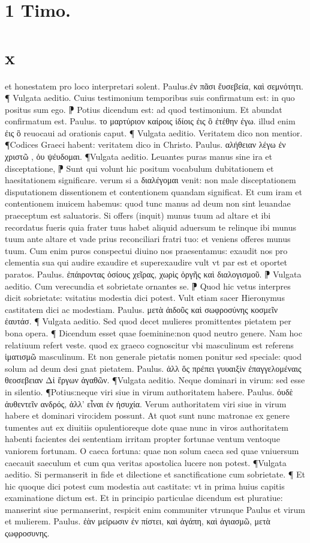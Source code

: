 \documentclass{article}
\begin{document}
\begin{pages}
\section*{1 Timo. }
\section*{x }
\marginpar{[ p.204 ]}\pstart et honestatem pro loco interpretari solent. Paulus.ἐν πᾶσι ἔυσεβεία, καὶ σεμνότητι. ¶ Vulgata aeditio. Cuius testimonium temporibus suis confirmatum est: in quo  positus sum ego. ⁋ Potius dicendum est: ad quod testimonium. Et abundat confirmatum est. Paulus. το μαρτύριον καίροις ἰδίοις ἐις ὃ ἐτέθην ἐγω. illud enim ἐις ὃ  reuocaui ad orationis caput. ¶ Vulgata aeditio. Veritatem dico non mentior. ¶Codices Graeci habent: veritatem dico in Christo. Paulus. αλήθειαν λέγω ἐν χριστῶ , ὀυ ψέυδομαι. ¶Vulgata aeditio. Leuantes puras manus sine ira et disceptatione, ⁋ Sunt qui volunt hic positum vocabulum dubitationem et haesitationem significare. verum si a διαλέγομαι venit: non male disceptationem disputationem dissentionem et contentionem quandam significat. Et cum iram et contentionem inuicem habemus: quod tunc manus ad deum non sint leuandae praeceptum est saluatoris. Si offers (inquit) munus tuum ad altare et ibi recordatus fueris quia frater tuus habet aliquid aduersum te relinque ibi munus tuum ante altare et vade prius reconciliari fratri tuo: et veniens offeres munus tuum. Cum enim puros conspectui diuino nos praesentamus: exaudit nos pro clementia sua qui audire exaudire et superexaudire vult vt par est et oportet paratos. Paulus. ἐπάιροντας ὁσίους χεῖρας, χωρὶς ὀργῆς καὶ διαλογισμοῦ. ⁋ Vulgata aeditio. Cum verecundia et sobrietate ornantes se. ⁋ Quod hic vetus interpres dicit sobrietate: vsitatius modestia dici potest. Vult etiam sacer Hieronymus castitatem dici ac modestiam. Paulus. μετὰ ἀιδοῦς καὶ σωφροσύνης κοσμεῖν ἐαυτάσ. ¶ Vulgata aeditio. Sed quod decet mulieres promittentes pietatem per bona opera. ¶ Dicendum esset quae foeminine:non quod neutro genere. Nam hoc relatiuum refert veste. quod ex graeco cognoscitur vbi masculinum est referens ἱματισμῶ masculinum. Et non generale pietatis nomen ponitur sed speciale: quod solum ad deum desi gnat pietatem. Paulus. ἀλλ ὅς πρέπει γυυαιξὶν ἐπαγγελομέναις θεοσεβειαν  Δἰ ἔργων ἀγαθῶν. ¶Vulgata aeditio. Neque dominari in virum: sed esse in silentio. ¶Potius:neque viri siue in virum authoritatem habere. Paulus. ὀυδὲ ἀυθεντεῖν ανδρός, ἀλλ’ εἶναι ἐν ἠσυχία. Verum authoritatem viri siue in virum habere et dominari viro:idem possunt. At quot sunt nunc matronae ex genere tumentes aut ex diuitiis opulentioreque dote quae nunc in viros authoritatem habenti facientes dei sententiam irritam propter fortunae ventum ventoque vaniorem fortunam. O caeca fortuna: quae non solum caeca sed quae vniuersum caecauit saeculum et cum qua veritas apostolica lucere  non potest. ¶Vulgata aeditio. Si permanserit in fide et dilectione et sanctificatione cum  sobrietate. ¶ Et hic quoque dici potest cum modestia aut castitate: vt in prima huius capitis examinatione dictum est. Et in principio particulae dicendum est pluratiue: manserint siue permanserint, respicit enim communiter vtrunque Paulus et virum et mulierem. Paulus. ἐὰν μείρωσιν ἐν πίστει, καὶ ἀγάπη, καὶ ἀγιασμῶ, μετὰ ςωφροσυνης.  \pend

\end{pages}
\end{document}
